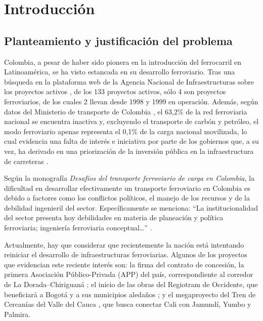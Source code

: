 
\chapter{Introducción}

\section{Planteamiento y justificación del problema}
Colombia, a pesar de haber sido pionera en la introducción del ferrocarril en Latinoamérica, se ha visto estancada en su desarrollo ferroviario. Tras una búsqueda en la plataforma web de la Agencia Nacional de Infraestructuras sobre los proyectos activos \autocite{aniProyectos}, de los 133 proyectos activos, sólo 4 son proyectos ferroviarios, de los cuales 2 llevan desde 1998 y 1999 en operación. Además, según datos del Ministerio de transporte de Colombia \autocite{mintransporteSurcos2024}, el 63,2\% de la red ferroviaria nacional se encuentra inactiva y, excluyendo el transporte de carbón y petróleo, el modo ferroviario apenas representa el 0,1\% de la carga nacional movilizada, lo cual evidencia una falta de interés e iniciativa por parte de los gobiernos que, a su vez, ha derivado en una priorización de la inversión pública en la infraestructura de carreteras \autocite{mintransporteDatosCarga}.

Según la monografía \textit{Desafíos del transporte ferroviario de carga en Colombia}, la dificultad en desarrollar efectivamente un transporte ferroviario en Colombia es debido a factores como los conflictos políticos, el manejo de los recursos y de la debilidad ingenieril del sector. Específicamente se menciona: “La institucionalidad del sector presenta hoy debilidades en materia de planeación y política ferroviaria; ingeniería ferroviaria conceptual…” \autocite[p.~17]{iabdDesafios}.

Actualmente, hay que considerar que recientemente la nación está intentando reiniciar el desarrollo de infraestructuras ferroviarias. Algunos de los proyectos que evidencian este reciente interés son: la firma del contrato de concesión, la primera Asociación Público-Privada (APP) del país, correspondiente al corredor de La Dorada–Chiriguaná \autocite{mintransporteAPP2025}; el inicio de las obras del Regiotram de Occidente, que beneficiará a Bogotá y a sus municipios aledaños \autocite{bogotaRegiotram2025}; y el megaproyecto del Tren de Cercanías del Valle del Cauca \autocite{valoraTrenValle2024}, que busca conectar Cali con Jamundí, Yumbo y Palmira.

